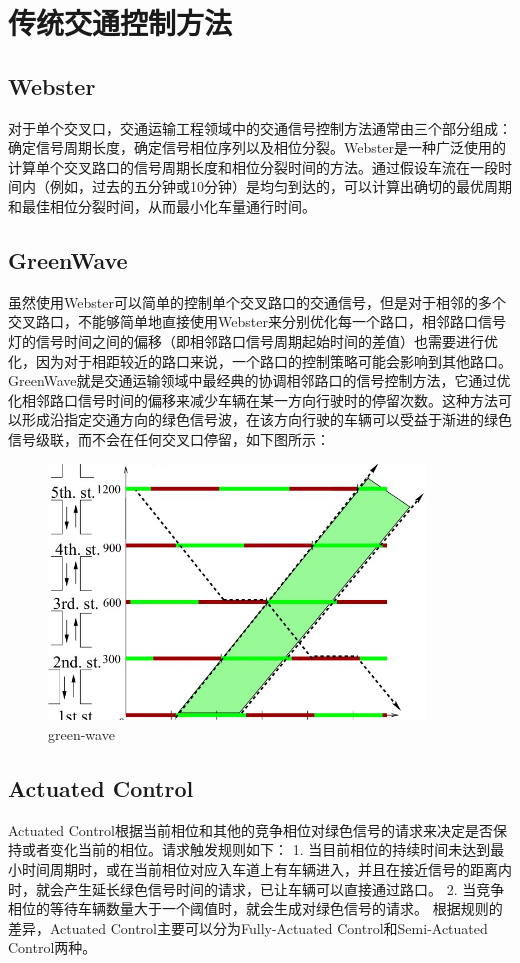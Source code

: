 \section{传统交通控制方法}
\subsection{Webster}
对于单个交叉口，交通运输工程领域中的交通信号控制方法通常由三个部分组成：确定信号周期长度，确定信号相位序列以及相位分裂。Webster是一种广泛使用的计算单个交叉路口的信号周期长度和相位分裂时间的方法。通过假设车流在一段时间内（例如，过去的五分钟或10分钟）是均匀到达的，可以计算出确切的最优周期和最佳相位分裂时间，从而最小化车量通行时间。

\subsection{GreenWave}
虽然使用Webster可以简单的控制单个交叉路口的交通信号，但是对于相邻的多个交叉路口，不能够简单地直接使用Webster来分别优化每一个路口，相邻路口信号灯的信号时间之间的偏移（即相邻路口信号周期起始时间的差值）也需要进行优化，因为对于相距较近的路口来说，一个路口的控制策略可能会影响到其他路口。
GreenWave就是交通运输领域中最经典的协调相邻路口的信号控制方法，它通过优化相邻路口信号时间的偏移来减少车辆在某一方向行驶时的停留次数。这种方法可以形成沿指定交通方向的绿色信号波，在该方向行驶的车辆可以受益于渐进的绿色信号级联，而不会在任何交叉口停留，如下图所示：
\begin{figure}[htb]
    \includegraphics[width=10cm]{fig/GreenWave.jpg}
    \caption{green-wave}
    \label{fig:green-wave}
\end{figure}

\subsection{Actuated Control}
Actuated Control根据当前相位和其他的竞争相位对绿色信号的请求来决定是否保持或者变化当前的相位。请求触发规则如下：
1. 当目前相位的持续时间未达到最小时间周期时，或在当前相位对应入车道上有车辆进入，并且在接近信号的距离内时，就会产生延长绿色信号时间的请求，已让车辆可以直接通过路口。 
2. 当竞争相位的等待车辆数量大于一个阈值时，就会生成对绿色信号的请求。
根据规则的差异，Actuated Control主要可以分为Fully-Actuated Control和Semi-Actuated Control两种。

